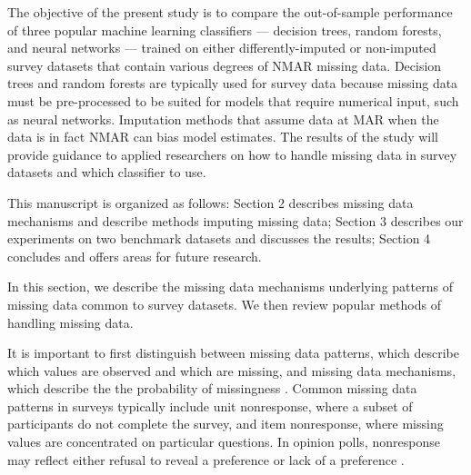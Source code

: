 \documentclass[10pt]{book}
\theoremstyle{definition}
\begin{document}
The objective of the present study is to compare the out-of-sample performance of three popular machine learning classifiers --- decision trees, random forests, and neural networks --- trained on either differently-imputed or non-imputed survey datasets that contain various degrees of NMAR missing data. Decision trees and random forests are typically used for survey data because missing data must be pre-processed to be suited for models that require numerical input, such as neural networks. Imputation methods that assume data at MAR when the data is in fact NMAR can bias model estimates. The results of the study will provide guidance to applied researchers on how to handle missing data in survey datasets and which classifier to use. 

This manuscript is organized as follows: Section 2 describes missing data mechanisms and describe methods imputing missing data; Section 3 describes our experiments on two benchmark datasets and discusses the results; Section 4 concludes and offers areas for future research. 

\par

\lhead[\footnotesize\thepage\fancyplain{}\leftmark]{}\rhead[]{\fancyplain{}\rightmark\footnotesize\thepage}%

\setcounter{chapter}{2}
\setcounter{equation}{0} %

In this section, we describe the missing data mechanisms underlying patterns of missing data common to survey datasets. We then review popular methods of handling missing data.


It is important to first distinguish between missing data patterns, which describe which values are observed and which are missing, and missing data mechanisms, which describe the the probability of missingness  \citep{little2014}. Common missing data patterns in surveys typically include unit nonresponse, where a subset of participants do not complete the survey, and item nonresponse, where missing values are concentrated on particular questions. In opinion polls, nonresponse may reflect either refusal to reveal a preference or lack of a preference \citep{de2003prevention}. 
\end{document}
